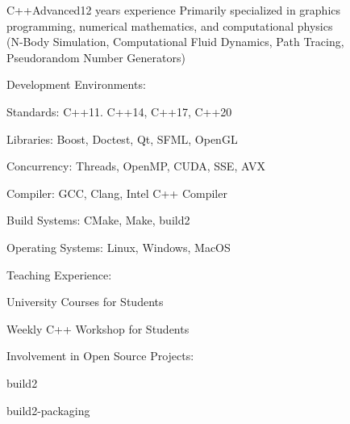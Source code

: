 \documentclass[a4paper,10pt]{cv}
\begin{document}
        \begin{cvLongSkillItem}{C++}{Advanced}{12 years experience}
          Primarily specialized in graphics programming, numerical mathematics, and computational physics \\
          (N-Body Simulation, Computational Fluid Dynamics, Path Tracing, Pseudorandom Number Generators)\\
          \vspace{-15pt}
          \begin{multicols}{2}
          Development Environments:
          \begin{cvItemize}
            \item Standards: C++11. C++14, C++17, C++20
            \item Libraries: Boost, Doctest, Qt, SFML, OpenGL
            \item Concurrency: Threads, OpenMP, CUDA, SSE, AVX
            \item Compiler: GCC, Clang, Intel C++ Compiler
            \item Build Systems: CMake, Make, build2
            \item Operating Systems: Linux, Windows, MacOS
          \end{cvItemize}
          Teaching Experience:
          \begin{cvItemize}
            \item University Courses for Students
            \item Weekly C++ Workshop for Students
          \end{cvItemize}
          Involvement in Open Source Projects:
          \begin{cvItemize}
            \item build2
            \item build2-packaging
          \end{cvItemize}
          \end{multicols}
        \end{cvLongSkillItem}
\end{document}
